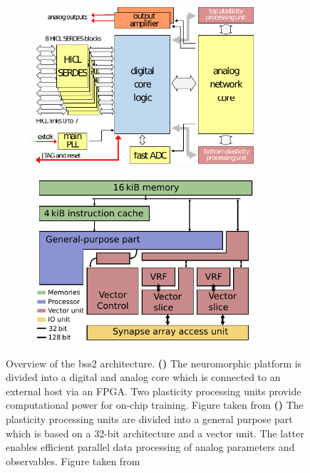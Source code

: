\begin{figure}
	\begin{subfigure}[c]{0.5\textwidth}
		\centering
		\caption{}
		\includegraphics[width=0.9\textwidth]{figures/bss2architecture_wtext.pdf}
		\label{hxstructure}
	\end{subfigure}	
	\begin{subfigure}[c]{0.5\textwidth}
		\centering
		\caption{}
		\includegraphics[width=0.9\textwidth]{figures/ppu_overview.pdf}
		\label{hxppu}
	\end{subfigure}
	\caption[Overview of the \gls{bss2} architecture.]{Overview of the \gls{bss2} architecture. \textbf{()} The neuromorphic platform is divided into a digital and analog core which is connected to an external host via an FPGA. Two plasticity processing units provide computational power for on-chip training.  Figure taken from \citealp{schemmel2017internal} \textbf{()} The plasticity processing units are divided into a general purpose part which is based on a 32-bit architecture and a vector unit. The latter enables efficient parallel data processing of analog parameters and observables. Figure taken from \cite{friedmann2016hybridlearning}}
\end{figure}

